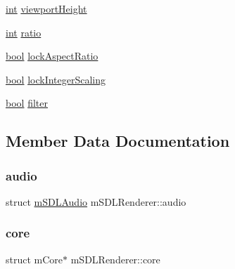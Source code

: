 \begin{DoxyCompactItemize}
\item 
\mbox{\hyperlink{ioapi_8h_a787fa3cf048117ba7123753c1e74fcd6}{int}} \mbox{\hyperlink{structm_s_d_l_renderer_af707350a61a015f402011acee913760b}{viewport\+Height}}
\item 
\mbox{\hyperlink{ioapi_8h_a787fa3cf048117ba7123753c1e74fcd6}{int}} \mbox{\hyperlink{structm_s_d_l_renderer_aaea38ed8a1f704651fd2868ac12ceb79}{ratio}}
\item 
\mbox{\hyperlink{libretro_8h_a4a26dcae73fb7e1528214a068aca317e}{bool}} \mbox{\hyperlink{structm_s_d_l_renderer_a3cba7c0bc4d64ded156cb0c8bbd61689}{lock\+Aspect\+Ratio}}
\item 
\mbox{\hyperlink{libretro_8h_a4a26dcae73fb7e1528214a068aca317e}{bool}} \mbox{\hyperlink{structm_s_d_l_renderer_af199bcb4ad141580017536dcf2eca7a8}{lock\+Integer\+Scaling}}
\item 
\mbox{\hyperlink{libretro_8h_a4a26dcae73fb7e1528214a068aca317e}{bool}} \mbox{\hyperlink{structm_s_d_l_renderer_a6d7c35d661db58e002955e821dc068fd}{filter}}
\end{DoxyCompactItemize}


\subsection{Member Data Documentation}
\mbox{\label{structm_s_d_l_renderer_a56bc00b697ae65b931a6fd3765e79e1a}} 
\subsubsection{\texorpdfstring{audio}{audio}}
{\footnotesize\ttfamily struct \mbox{\hyperlink{sdl-audio_8h_structm_s_d_l_audio}{m\+S\+D\+L\+Audio}} m\+S\+D\+L\+Renderer\+::audio}

\mbox{\label{structm_s_d_l_renderer_a82675cacb399f5b6242ded1505c22389}} 
\subsubsection{\texorpdfstring{core}{core}}
{\footnotesize\ttfamily struct m\+Core$\ast$ m\+S\+D\+L\+Renderer\+::core}

\mbox{\label{structm_s_d_l_renderer_aa8bf6b632d75051c599b78dfadeb97bb}} 

